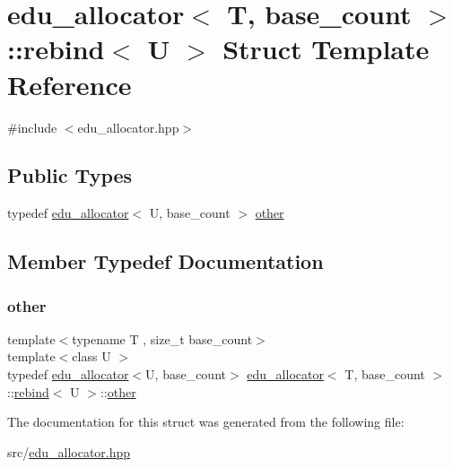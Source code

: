 \hypertarget{structedu__allocator_1_1rebind}{}\section{edu\+\_\+allocator$<$ T, base\+\_\+count $>$\+:\+:rebind$<$ U $>$ Struct Template Reference}
\label{structedu__allocator_1_1rebind}


{\ttfamily \#include $<$edu\+\_\+allocator.\+hpp$>$}

\subsection*{Public Types}
\begin{DoxyCompactItemize}
\item 
typedef \hyperlink{classedu__allocator}{edu\+\_\+allocator}$<$ U, base\+\_\+count $>$ \hyperlink{structedu__allocator_1_1rebind_ac475b2b7ed6990258e8ed36214fa16c9}{other}
\end{DoxyCompactItemize}


\subsection{Member Typedef Documentation}
\mbox{\label{structedu__allocator_1_1rebind_ac475b2b7ed6990258e8ed36214fa16c9}} 
\subsubsection{\texorpdfstring{other}{other}}
{\footnotesize\ttfamily template$<$typename T , size\+\_\+t base\+\_\+count$>$ \\
template$<$class U $>$ \\
typedef \hyperlink{classedu__allocator}{edu\+\_\+allocator}$<$U, base\+\_\+count$>$ \hyperlink{classedu__allocator}{edu\+\_\+allocator}$<$ T, base\+\_\+count $>$\+::\hyperlink{structedu__allocator_1_1rebind}{rebind}$<$ U $>$\+::\hyperlink{structedu__allocator_1_1rebind_ac475b2b7ed6990258e8ed36214fa16c9}{other}}



The documentation for this struct was generated from the following file\+:\begin{DoxyCompactItemize}
\item 
src/\hyperlink{edu__allocator_8hpp}{edu\+\_\+allocator.\+hpp}\end{DoxyCompactItemize}
